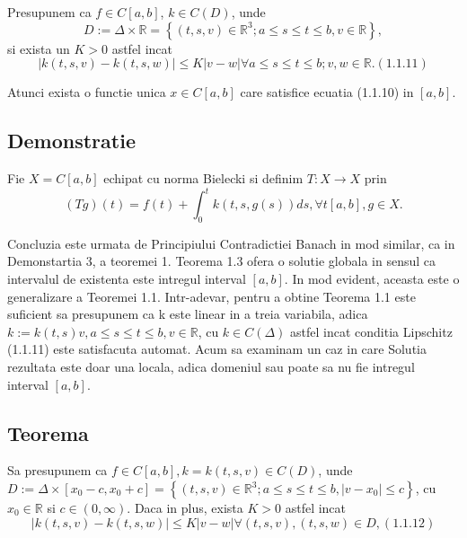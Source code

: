 \documentclass[a4paper,12pt,oneside]{report}
\begin{document}
Presupunem ca \(f\in C\left [ a,b \right ]\), \(k\in C\left ( D \right )\), unde 
\begin{displaymath}
  D:= \Delta \times \mathbb{R} = \left \{ \left ( t,s,v \right )\in \mathbb{R}^{3}; a\leq s\leq t\leq b, v\in \mathbb{R}\right \}, 
\end{displaymath}
si exista un \(K> 0\) astfel incat
\begin{displaymath}
  \left | k\left ( t,s,v \right )  - k\left ( t,s,w \right )\right |\leq K\left | v-w \right |\forall a\leq s\leq t\leq b; v,w\in \mathbb{R}.(1.1.11)
\end{displaymath}

Atunci exista o functie unica \(x\in C\left [ a,b \right ]\) care satisfice ecuatia (1.1.10) in \(\left [ a,b \right ]\).

\subsection{Demonstratie}

Fie \(X = C \left [ a,b \right ]\) echipat cu norma Bielecki si definim \(T : X \rightarrow X\) prin 
\begin{displaymath}
  \left ( Tg \right )\left ( t \right ) = f\left ( t \right ) + \int_{0}^{t}k\left ( t,s,g\left ( s \right ) \right )ds, \forall t \left [ a,b \right ], g\in X. 
\end{displaymath}

	Concluzia este urmata de Principiului Contradictiei Banach in mod similar, ca in Demonstartia 3, a teoremei 1.
	Teorema 1.3 ofera o solutie globala in sensul ca intervalul de existenta este intregul interval \(\left [ a,b \right ]\). In mod evident, aceasta este o generalizare a Teoremei 1.1. Intr-adevar, pentru a obtine Teorema 1.1 este suficient sa presupunem ca k este linear in a treia variabila, adica \(k:= k\left ( t,s \right )v, a\leq s\leq t\leq b, v\in \mathbb{R}\), cu \(k \in C\left ( \Delta  \right )\) astfel incat conditia Lipschitz (1.1.11) este satisfacuta automat. 
	Acum sa examinam un caz in care Solutia rezultata este doar una locala, adica domeniul sau poate sa nu fie intregul interval \(\left [ a,b \right ]\). 

\subsection{Teorema}

Sa presupunem ca \(f\in C\left [ a,b \right ] , k = k\left ( t,s,v \right ) \in C\left ( D \right )\), unde \(D := \Delta \times \left [ x_{0} - c, x_{0} + c \right ] = \left \{ \left ( t,s,v \right ) \in \mathbb{R}^{3} ; a \leq s\leq t\leq b, \left | v - x_{0} \right |\leq c\right \}\), cu \(x_{0} \in \mathbb{R}\) si \(c\in \left ( 0, \infty  \right )\). Daca in plus, exista \(K > 0\) astfel incat
\begin{displaymath}
  \left | k\left ( t,s,v \right ) - k\left ( t,s,w \right )\right | \leq K \left | v - w \right | \forall \left ( t,s,v \right ), \left ( t,s,w \right ) \in D, (1.1.12)
\end{displaymath}
\end{document}
